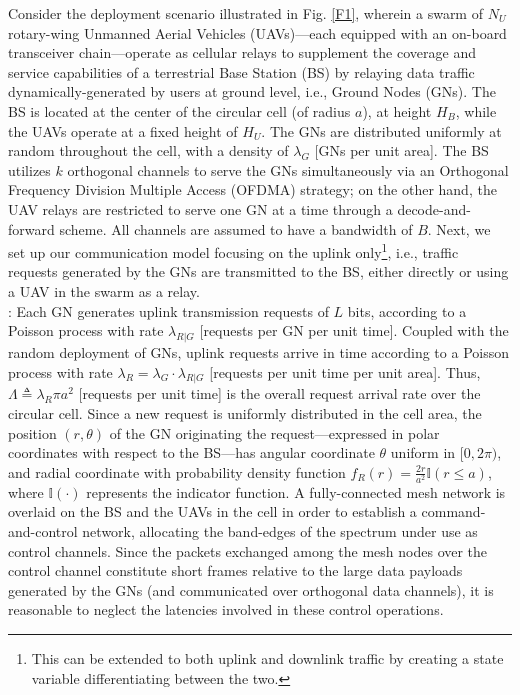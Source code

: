 \documentclass[10pt, twocolumn]{IEEEtran}
\theoremstyle{plain}
\theoremstyle{definition}
\theoremstyle{remark}
\begin{document}
Consider the deployment scenario illustrated in Fig. \ref{F1}, wherein a swarm of $N_{U}$ rotary-wing Unmanned Aerial Vehicles (UAVs)---each equipped with an on-board transceiver chain---operate as cellular relays to supplement the coverage and service capabilities of a terrestrial Base Station (BS) by relaying data traffic dynamically-generated by users at ground level, i.e., Ground Nodes (GNs). The BS is located at the center of the circular cell (of radius $a$), at height $H_{B}$, while the UAVs operate at a fixed height of $H_{U}$. The GNs are distributed uniformly at random throughout the cell, with a density of $\lambda_{G}$ [GNs per unit area]. The BS utilizes $k$ orthogonal channels to serve the GNs simultaneously via an Orthogonal Frequency Division Multiple Access (OFDMA) strategy; on the other hand, the UAV relays are restricted to serve one GN at a time through a decode-and-forward scheme. All channels are assumed to have a bandwidth of $B$. Next, we set up our communication model focusing on the uplink only\footnote{This can be extended to both uplink and downlink traffic by creating a state variable differentiating between the two.}, i.e., traffic requests generated by the GNs are transmitted to the BS, either directly or using a UAV in the swarm as a relay.\\
: Each GN generates uplink transmission requests of $L$ bits, according to a Poisson process with rate $\lambda_{R{|}G}$ [requests per GN per unit time]. Coupled with the random deployment of GNs, uplink requests arrive in time according to a Poisson process with rate $\lambda_{R}{=}\lambda_{G}{\cdot}\lambda_{R{|}G}$ [requests per unit time per unit area]. Thus, $\Lambda{\triangleq}\lambda_{R}\pi a^{2}$ [requests per unit time] is the overall request arrival rate over the circular cell. Since a new request is uniformly distributed in the cell area, the position $(r,\theta)$ of the GN originating the request---expressed in polar coordinates with respect to the BS---has angular coordinate $\theta$ uniform in $[0,2\pi)$, and radial coordinate with probability density function $f_{R}(r){=}\frac{2r}{a^2}\mathbb{I}(r{\leq}a)$, where $\mathbb{I}(\cdot)$ represents the indicator function. A fully-connected mesh network is overlaid on the BS and the UAVs in the cell in order to establish a command-and-control network, allocating the band-edges of the spectrum under use as control channels. Since the packets exchanged among the mesh nodes over the control channel constitute short frames relative to the large data payloads generated by the GNs (and communicated over orthogonal data channels), it is reasonable to neglect the latencies involved in these control operations.\\
\end{document}
